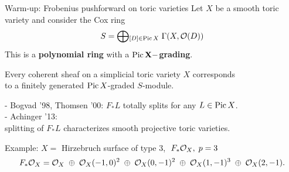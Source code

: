 \documentclass[beamer]{paper}
\begin{document}
\begin{frame}[t]{Warm-up: Frobenius pushforward on toric varieties}
  Let $X$ be a smooth toric variety and consider the Cox ring
  \[ S = \bigoplus\!{}_{[D]\in\operatorname{Pic}X} \; \Gamma(X, \mathcal{O}(D)) \]
  This is a \textbf{\color{rossred}polynomial ring} with a {\color{rossred}$\mathbf{\operatorname{Pic}X-}$\textbf{grading}}.

  \pause
  \begin{theorem}
    Every coherent sheaf on a simplicial toric variety $X$ corresponds \\
    to a finitely generated {\color{rossred}$\operatorname{Pic}X$-graded} $S$-module.
  \end{theorem}

  \vfill
  \pause
  - Bogvad '98, Thomsen '00: $F_*L$ totally splits for any $L\in\operatorname{Pic}X$. \\
  \pause
  - Achinger '13: \\ \hfill splitting of $F_*L$ characterizes smooth projective toric varieties.

  \vfill
  \pause
  \begin{block}{Example: $X = $ Hirzebruch surface of type 3, $\;F_*\mathcal{O}_X, \;p = 3$}
    \vspace*{-0.2in}
    \[ F_*\mathcal{O}_X = \mathcal{O}_X \;\oplus\; \mathcal{O}_X(-1,0)^2 \;\oplus\; \mathcal{O}_X(0,-1)^2 \;\oplus\; \mathcal{O}_X(1,-1)^3 \;\oplus\; \mathcal{O}_X(2,-1). \]
  \end{block}

\end{frame}




  
\end{document}
